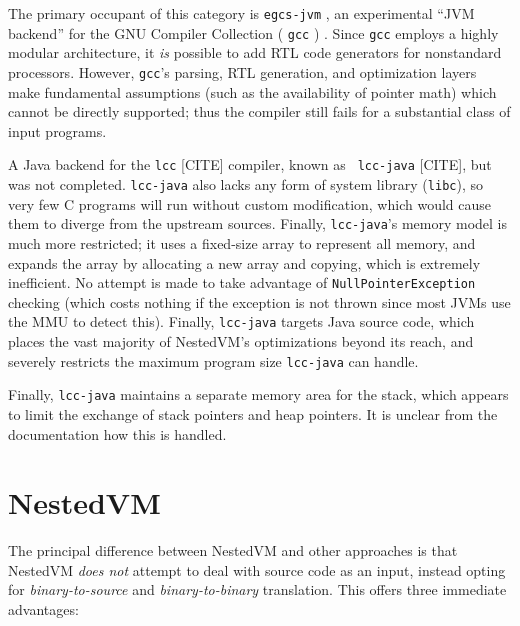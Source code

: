 \documentclass{acmconf}
\begin{document}
The primary occupant of this category is {\tt egcs-jvm}
\cite{egcsjvm}, an experimental ``JVM backend'' for the GNU Compiler
Collection ( {\tt gcc} ) \cite{gcc}.  Since {\tt gcc} employs a highly
modular architecture, it {\it is} possible to add RTL code generators
for nonstandard processors.  However, {\tt gcc}'s parsing, RTL
generation, and optimization layers make fundamental assumptions (such
as the availability of pointer math) which cannot be directly
supported; thus the compiler still fails for a substantial class of
input programs.

A Java backend for the {\tt lcc} [CITE] compiler, known as {\tt
lcc-java} [CITE], but was not completed.  {\tt lcc-java} also lacks
any form of system library ({\tt libc}), so very few C programs will
run without custom modification, which would cause them to diverge
from the upstream sources.  Finally, {\tt lcc-java}'s memory model is
much more restricted; it uses a fixed-size array to represent all
memory, and expands the array by allocating a new array and copying,
which is extremely inefficient.  No attempt is made to take advantage
of {\tt NullPointerException} checking (which costs nothing if the
exception is not thrown since most JVMs use the MMU to detect this).
Finally, {\tt lcc-java} targets Java source code, which places the
vast majority of NestedVM's optimizations beyond its reach, and
severely restricts the maximum program size {\tt lcc-java} can handle.

Finally, {\tt lcc-java} maintains a separate memory area for the
stack, which appears to limit the exchange of stack pointers and heap
pointers.  It is unclear from the documentation how this is handled.


\section{NestedVM}

The principal difference between NestedVM and other approaches is that
NestedVM {\it does not} attempt to deal with source code as an input,
instead opting for {\it binary-to-source} and {\it binary-to-binary}
translation.  This offers three immediate advantages:
\end{document}
